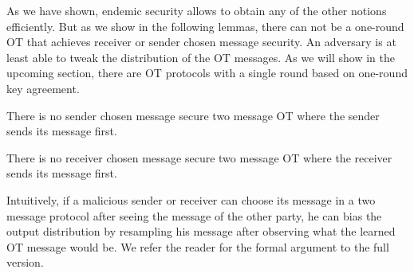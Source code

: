 As we have shown, endemic security allows to obtain any of the other notions efficiently. But as we show in the following lemmas, there can not be a one-round OT that achieves receiver or sender chosen message security. An adversary is at least able to tweak the distribution of the OT messages. As we will show in the upcoming section, there are OT protocols with a single round based on one-round key agreement.

\begin{lemma}\label{lem:nosendtweak}
There is no sender chosen message secure two message OT where the sender sends its message first. 
\end{lemma}


\begin{lemma}\label{lem:norectweak}
There is no receiver chosen message secure two message OT where the receiver sends its message first.
\end{lemma}

Intuitively, if a malicious sender or receiver can choose its message in a two message protocol after seeing the message of the other party, he can bias the output distribution by resampling his message after observing what the learned OT message would be. We refer the reader for the formal argument to \iffullversion
{}\else the full version\fi.